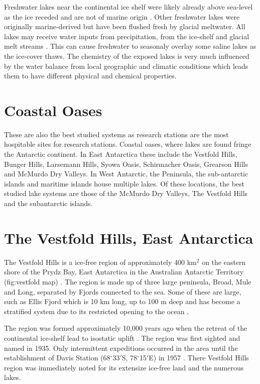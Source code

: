 Freshwater lakes near the continental ice shelf were likely already above sea-level as the ice receded and are not of marine origin \cite{Laybourne-Parry1992} \cite{Bronge1996}.
Other freshwater lakes were originally marine-derived but have been flushed fresh by glacial meltwater\cite{Pickard1986}\cite{Bird1991}.
All lakes may receive water inputs from precipitation, from the ice-shelf and glacial melt streams \cite{Burton1981}. 
This can cause freshwater to seasonaly overlay some saline lakes as the ice-cover thaws.
The chemistry of the exposed lakes is very much influenced by the water balance from local geographic and climatic conditions which leads them to have different physical and chemical properties.

\section{Coastal Oases}
These are also the best studied systems as research stations are the most hospitable sites for research stations.
Coastal oases, where lakes are found fringe the Antarctic continent.
In East Antarctica these include the Vestfold Hills, Bunger Hills, Larsemann Hills, Syowa Oasis, Schirmacher Oasis, Grearson Hills and McMurdo Dry Valleys.
In West Antarctic, the Peninsula, the sub-antarctic islands and maritime islands house multiple lakes. 
Of these locations, the best studied lake systems are those of the McMurdo Dry Valleys, The Vestfold Hills and the subantarctic islands.


\section{The Vestfold Hills, East Antarctica}
The Vestfold Hills is a ice-free region of approximately 400 km$^2$ on the eastern shore of the Prydz Bay, East Antarctica in the Australian Antarctic Territory (fig:vestfold map) \cite{Gibson1999}.
The region is made up of three large peninsula, Broad, Mule and Long, separated by Fjords connected to the sea.
Some of these are large, such as Ellis Fjord which is 10 km long, up to 100 m deep and has become a stratified system due to its restricted opening to the ocean \cite{Burke1988}.

The region was formed approximately 10,000 years ago when the retreat of the continental ice-shelf lead to isostatic uplift \cite{Burton1981}. %
The region was first sighted and named in 1935\cite{Law1959}.
Only intermittent expeditions occurred in the area until the establishment of Davis Station (68$^{\circ}$33$'$S, 78$^{\circ}$15$'$E) in 1957 \cite {Law1959}. 
There Vestfold Hills region was immediately noted for its extensize ice-free land and the numerous lakes\cite{Johnstone1973}.

